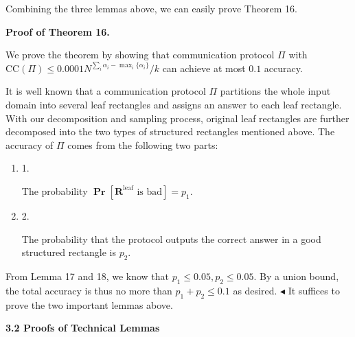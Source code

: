 \documentclass[10pt,a4paper]{article}
\begin{document}
Combining the three lemmas above, we can easily prove Theorem 16.\par




\par\medskip\noindent\textbf{Proof of Theorem 16.}\par




We prove the theorem by showing that communication protocol $\Pi$ with $\text{CC}(\Pi)\leq 0.0001N^{\sum_{i}{\alpha_{i}}-\mathop{\max}_{i}\{\alpha_{i}\}}/k$ can achieve at most $0.1$ accuracy.\par




It is well known that a communication protocol $\Pi$ partitions the whole input domain into several leaf rectangles and assigns an answer to each leaf rectangle. With our decomposition and sampling process, original leaf rectangles are further decomposed into the two types of structured rectangles mentioned above. The accuracy of $\Pi$ comes from the following two parts:\par


\begin{enumerate}


\item[] 
1. 


The probability $\operatorname*{\mathbf{Pr}}[\bm{R}^{\text{leaf}}\text{ is bad}]=p_{1}$.\par





\item[] 
2. 


The probability that the protocol outputs the correct answer in a good structured rectangle is $p_{2}$.\par





\end{enumerate}


From Lemma 17 and 18, we know that $p_{1}\leq 0.05,p_{2}\leq 0.05$. By a union bound, the total accuracy is thus no more than $p_{1}+p_{2}\leq 0.1$ as desired.
$\blacktriangleleft$
It suffices to prove the two important lemmas above.\par






\par\medskip\noindent\textbf{
3.2 Proofs of Technical Lemmas}\par
\end{document}
